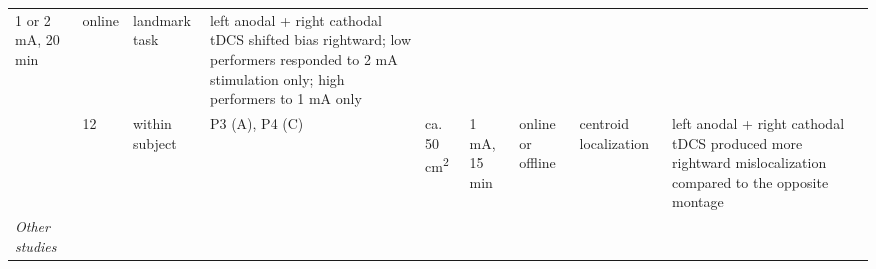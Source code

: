 \documentclass[11pt,english,]{memoir}
\begin{document}
\begin{longtable}[]{@{}lllllllll@{}}
\begin{minipage}[t]{0.04\columnwidth}
1 or 2
mA, 20
min\strut
\end{minipage} & \begin{minipage}[t]{0.04\columnwidth}\raggedright
online\strut
\end{minipage} & \begin{minipage}[t]{0.10\columnwidth}\raggedright
landmark task\strut
\end{minipage} & \begin{minipage}[t]{0.28\columnwidth}\raggedright
left anodal + right cathodal tDCS shifted bias rightward;
low performers responded to 2 mA stimulation only; high
performers to 1 mA only\strut
\end{minipage}\tabularnewline
\begin{minipage}[t]{0.09\columnwidth}\raggedright
\textcite{Wright2014}\strut
\end{minipage} & \begin{minipage}[t]{0.02\columnwidth}\raggedright
12\strut
\end{minipage} & \begin{minipage}[t]{0.04\columnwidth}\raggedright
within
subject\strut
\end{minipage} & \begin{minipage}[t]{0.10\columnwidth}\raggedright
P3 (A), P4 (C)\strut
\end{minipage} & \begin{minipage}[t]{0.04\columnwidth}\raggedright
ca.
50
cm\textsuperscript{2}\strut
\end{minipage} & \begin{minipage}[t]{0.04\columnwidth}\raggedright
1 mA,
15 min\strut
\end{minipage} & \begin{minipage}[t]{0.04\columnwidth}\raggedright
online
or
offline\strut
\end{minipage} & \begin{minipage}[t]{0.10\columnwidth}\raggedright
centroid
localization\strut
\end{minipage} & \begin{minipage}[t]{0.28\columnwidth}\raggedright
left anodal + right cathodal tDCS produced more rightward
mislocalization compared to the opposite montage\strut
\end{minipage}\tabularnewline
\begin{minipage}[t]{0.09\columnwidth}\raggedright
\emph{Other studies}\strut
\end{minipage} & \begin{minipage}[t]{0.02\columnwidth}\raggedright

\end{minipage}
\end{longtable}
\end{document}
